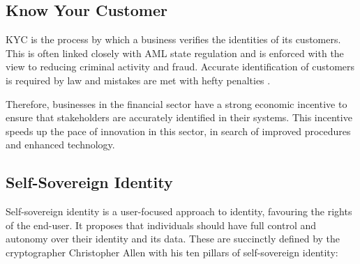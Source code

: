 \subsection{Know Your Customer}
\acf{KYC} is the process by which a business verifies the identities of its customers. This is often linked closely with \acf{AML} state regulation and is enforced with the view to reducing criminal activity and fraud. Accurate identification of customers is required by law and mistakes are met with hefty penalties \cite{nasiripour_uk_2012, financial_conduct_authority_fca_2017}.

Therefore, businesses in the financial sector have a strong economic incentive to ensure that stakeholders are accurately identified in their systems. This incentive speeds up the pace of innovation in this sector, in search of improved procedures and enhanced technology.

\subsection{Self-Sovereign Identity}
Self-sovereign identity is a user-focused approach to identity, favouring the rights of the end-user. It proposes that individuals should have full control and autonomy over their identity and its data. These are succinctly defined by the cryptographer Christopher Allen \cite{allen_path_2016} with his ten pillars of self-sovereign identity:


